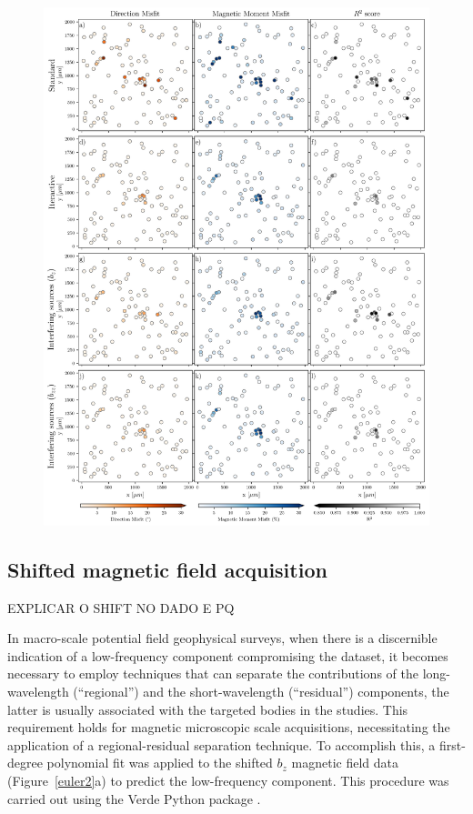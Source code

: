 \begin{figure}[tb!]
  \centering
  \includegraphics[width=1\linewidth]{figures/inversion-comparion-1.png}
  \caption{
      }
  \label{inversion1}
\end{figure}


\subsection{Shifted magnetic field acquisition}

EXPLICAR O SHIFT NO DADO E PQ

In macro-scale potential field geophysical surveys, when there is a discernible indication of a low-frequency component compromising the dataset, it becomes necessary to employ techniques that can separate the contributions of the long-wavelength (``regional'') and the short-wavelength (``residual'') components, the latter is usually associated with the targeted bodies in the studies. This requirement holds for magnetic microscopic scale acquisitions, necessitating the application of a regional-residual separation technique. To accomplish this, a first-degree polynomial fit was applied to the shifted $b_z$ magnetic field data (Figure~\ref{euler2}a) to predict the low-frequency component. This procedure was carried out using the Verde Python package \citep{verde2018}. 

